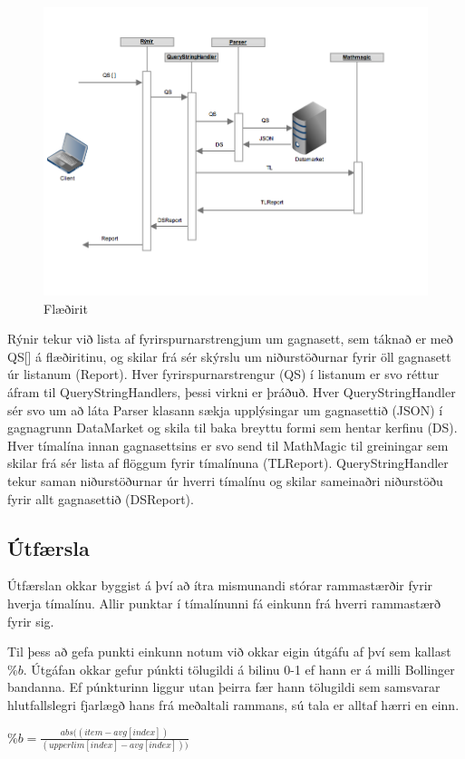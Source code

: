 \documentclass{article}
\begin{document}
\begin{figure}[H]
  \centering
  \includegraphics[width=.75\textwidth]{rynir_sequence-2.png} 
  \caption{Flæðirit} 
\end{figure}

Rýnir tekur við lista af fyrirspurnarstrengjum um gagnasett, sem táknað er með
QS[] á flæðiritinu, og skilar frá sér skýrslu um niðurstöðurnar fyrir öll
gagnasett úr listanum (Report). Hver fyrirspurnarstrengur (QS) í listanum er svo
réttur áfram til QueryStringHandlers, þessi virkni er þráðuð. Hver
QueryStringHandler sér svo um að láta Parser klasann sækja upplýsingar um
gagnasettið (JSON) í gagnagrunn DataMarket og skila til baka breyttu formi sem
hentar kerfinu (DS). Hver tímalína innan gagnasettsins er svo send til MathMagic
til greiningar sem skilar frá sér lista af flöggum fyrir tímalínuna (TLReport).
QueryStringHandler tekur saman niðurstöðurnar úr hverri tímalínu og skilar
sameinaðri niðurstöðu fyrir allt gagnasettið (DSReport).

\subsection{Útfærsla}
\label{sec:imp_our}

Útfærslan okkar byggist á því að ítra mismunandi stórar rammastærðir fyrir
hverja tímalínu.
Allir punktar í tímalínunni fá einkunn frá hverri rammastærð fyrir sig. 

Til þess að gefa punkti einkunn notum við okkar eigin útgáfu af því sem kallast $\%b$. 
Útgáfan okkar gefur púnkti tölugildi á bilinu 0-1 ef hann er á milli Bollinger bandanna.
Ef púnkturinn liggur utan þeirra fær hann tölugildi sem samsvarar hlutfallslegri fjarlægð hans frá meðaltali rammans, 
sú tala er alltaf hærri en einn.

\begin{center}
  $\%b=\frac{abs((item - avg[index])}{(upperlim[index] - avg[index]))}$
\end{center}
\end{document}
